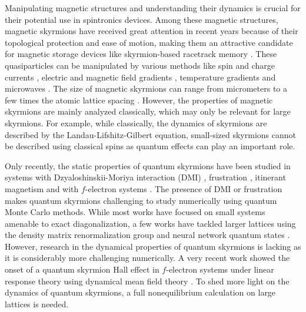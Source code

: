 \documentclass[aps,prb,twocolumn,superscriptaddress,a4paper,longbibliography]{revtex4-2}
\begin{document}
Manipulating magnetic structures and understanding their dynamics is crucial for their potential use in spintronics devices. Among these magnetic structures, magnetic skyrmions have received great attention in recent years because of their topological protection and ease of motion, making them an attractive candidate for magnetic storage devices like skyrmion-based racetrack memory \cite{nagaosa_topological_2013,bogdanov_physical_2020,kiselev_chiral_2011,romming_writing_2013,schutte_inertia_2014,tomasello_strategy_2014,heinze_spontaneous_2011}. These quasiparticles can be manipulated by various methods like spin and charge currents \cite{jiang_direct_2017,juge_current-driven_2019,woo_current-driven_2018,yu_skyrmion_2012,jonietz_spin_2010}, electric and magnetic field gradients \cite{upadhyaya_electric-field_2015,liu_skyrmion_2013,zhang_manipulation_2018,komineas_skyrmion_2015}, temperature gradients \cite{everschor_rotating_2012,kong_dynamics_2013} and microwaves \cite{wang_driving_2015}. The size of magnetic skyrmions can range from micrometers to a few times the atomic lattice spacing \cite{nagaosa_topological_2013}. 
However, the properties of magnetic skyrmions are mainly analyzed classically, which may only be relevant for large skyrmions.
For example, while classically, the dynamics of skyrmions are described by the Landau-Lifshitz-Gilbert equation, small-sized skyrmions cannot be described using classical spins as quantum effects can play an important role.

Only recently, the static properties of quantum skyrmions have been studied in systems with Dzyaloshinskii-Moriya interaction (DMI) \cite{takashima_quantum_2016,gauyacq_model_2019,siegl_controlled_2022,haller_quantum_2022,sotnikov_probing_2021,maeland_quantum_2022,joshi_ground_2023}, frustration \cite{lohani_quantum_2019}, itinerant magnetism \cite{Kobayashi2022} and with $f$-electron systems \cite{peters_quantum_2023}. The presence of DMI or frustration makes quantum skyrmions challenging to study numerically using quantum Monte Carlo methods. While most works have focused on small systems amenable to exact diagonalization, a few works have tackled larger lattices using the density matrix renormalization group \cite{haller_quantum_2022} and neural network quantum states \cite{joshi_ground_2023}. However, research in the dynamical properties of quantum skyrmions is lacking as it is considerably more challenging numerically. A very recent work showed the onset of a quantum skyrmion Hall effect in $f$-electron systems under linear response theory using dynamical mean field theory \cite{peters_quantum_2023}. To shed more light on the dynamics of quantum skyrmions, a full nonequilibrium calculation on large lattices is needed.
\end{document}
